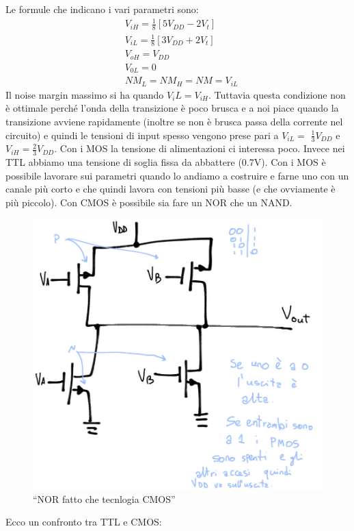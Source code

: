 \documentclass[
]{book}
\begin{document}
Le formule che indicano i vari parametri sono: \[
\begin{aligned}&V_{iH}=\frac{1}{8}[5V_{DD}-2V_{t}]\\&V_{iL}=\frac{1}{8}[3V_{DD}+2V_{t}]\\&V_{oH}=V_{DD}\\&V_{0L}=0\\&NM_{L}=NM_{H}=NM=V_{iL}\end{aligned}
\] Il noise margin massimo si ha quando \(V_iL=V_{iH}\). Tuttavia questa
condizione non è ottimale perché l'onda della transizione è poco brusca
e a noi piace quando la transizione avviene rapidamente (inoltre se non
è brusca passa della corrente nel circuito) e quindi le tensioni di
input spesso vengono prese pari a \(V_{iL}=\) \(\frac{1}{3}V_{DD}\)
e\(V_{iH}=\frac{2}{3}V_{DD}.\) Con i MOS la tensione di alimentazioni ci
interessa poco. Invece nei TTL abbiamo una tensione di soglia fissa da
abbattere (0.7V). Con i MOS è possibile lavorare sui parametri quando lo
andiamo a costruire e farne uno con un canale più corto e che quindi
lavora con tensioni più basse (e che ovviamente è più piccolo). Con CMOS
è possibile sia fare un NOR che un NAND.

\begin{figure}
\centering
\includegraphics[width=0.5\linewidth,height=\textheight,keepaspectratio]{immagini/26.jpg}
\caption{``NOR fatto che tecnlogia CMOS''}
\end{figure}

Ecco un confronto tra TTL e CMOS:
\end{document}
